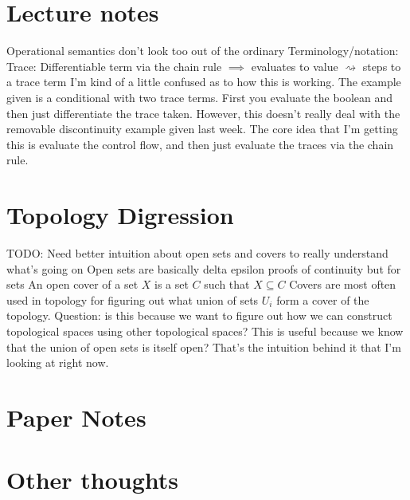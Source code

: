 \documentclass{article}
\begin{document}
    \section{Lecture notes}
    Operational semantics don't look too out of the ordinary
    Terminology/notation:
    Trace: Differentiable term via the chain rule
    \newline
    $\implies$ evaluates to value
    \newline
    $\rightsquigarrow$ steps to a trace term
    \newline
    I'm kind of a little confused as to how this is working. The example given is a conditional with two trace terms. First you evaluate the boolean and then just differentiate the trace taken. However, this doesn't really deal with the removable discontinuity example given last week.
    \newline
    The core idea that I'm getting this is evaluate the control flow, and then just evaluate the traces via the chain rule. 
    \newline
    \section{Topology Digression}
    TODO: Need better intuition about open sets and covers to really understand what's going on
    \newline
    Open sets are basically delta epsilon proofs of continuity but for sets
    \newline
    An open cover of a set $X$ is a set $C$ such that $X \subseteq C$
    \newline
    Covers are most often used in topology for figuring out what union of sets $U_i$ form a cover of the topology. Question: is this because we want to figure out how we can construct topological spaces using other topological spaces? This is useful because we know that the union of open sets is itself open? That's the intuition behind it that I'm looking at right now. 
    \section{Paper Notes}
    
    \section{Other thoughts}
\end{document}
